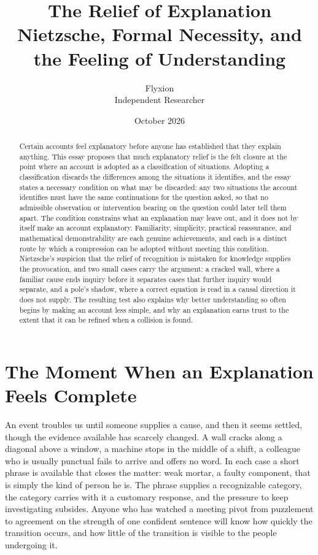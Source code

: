 \documentclass[11pt,letterpaper]{article}
\title{\textbf{The Relief of Explanation}\\[0.6ex]
\large Nietzsche, Formal Necessity, and the Feeling of Understanding}
\author{Flyxion\\ \small Independent Researcher}
\date{October 2026}
\theoremstyle{definition}
\begin{document}
\maketitle

\begin{abstract}
\noindent Certain accounts feel explanatory before anyone has established that they explain anything. This essay proposes that much explanatory relief is the felt closure at the point where an account is adopted as a classification of situations. Adopting a classification discards the differences among the situations it identifies, and the essay states a necessary condition on what may be discarded: any two situations the account identifies must have the same continuations for the question asked, so that no admissible observation or intervention bearing on the question could later tell them apart. The condition constrains what an explanation may leave out, and it does not by itself make an account explanatory. Familiarity, simplicity, practical reassurance, and mathematical demonstrability are each genuine achievements, and each is a distinct route by which a compression can be adopted without meeting this condition. Nietzsche's suspicion that the relief of recognition is mistaken for knowledge supplies the provocation, and two small cases carry the argument: a cracked wall, where a familiar cause ends inquiry before it separates cases that further inquiry would separate, and a pole's shadow, where a correct equation is read in a causal direction it does not supply. The resulting test also explains why better understanding so often begins by making an account less simple, and why an explanation earns trust to the extent that it can be refined when a collision is found.
\end{abstract}

\section{The Moment When an Explanation Feels Complete}

An event troubles us until someone supplies a cause, and then it seems settled, though the evidence available has scarcely changed. A wall cracks along a diagonal above a window, a machine stops in the middle of a shift, a colleague who is usually punctual fails to arrive and offers no word. In each case a short phrase is available that closes the matter: weak mortar, a faulty component, that is simply the kind of person he is. The phrase supplies a recognizable category, the category carries with it a customary response, and the pressure to keep investigating subsides. Anyone who has watched a meeting pivot from puzzlement to agreement on the strength of one confident sentence will know how quickly the transition occurs, and how little of the transition is visible to the people undergoing it.
\end{document}
